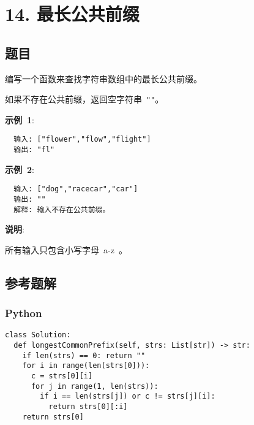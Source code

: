 \newpage
\section{14. 最长公共前缀}
\label{leetcode:14}

\subsection{题目}

编写一个函数来查找字符串数组中的最长公共前缀。

如果不存在公共前缀，返回空字符串 \verb|""|。

\textbf{示例 1}:

\begin{verbatim}
  输入: ["flower","flow","flight"]
  输出: "fl"
\end{verbatim}

\textbf{示例 2}:

\begin{verbatim}
  输入: ["dog","racecar","car"]
  输出: ""
  解释: 输入不存在公共前缀。
\end{verbatim}

\textbf{说明}:

所有输入只包含小写字母 a-z 。

\subsection{参考题解}

\subsubsection{Python}

\begin{verbatim}
class Solution:
  def longestCommonPrefix(self, strs: List[str]) -> str:
    if len(strs) == 0: return ""
    for i in range(len(strs[0])):
      c = strs[0][i]
      for j in range(1, len(strs)):
        if i == len(strs[j]) or c != strs[j][i]:
          return strs[0][:i]
    return strs[0]
\end{verbatim}
